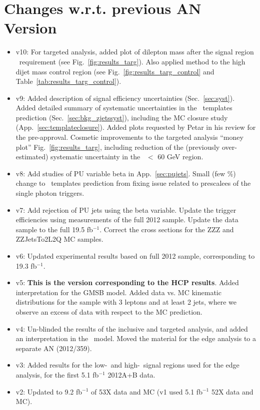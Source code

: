 \section{Changes w.r.t. previous AN Version}
\label{sec:changes}

\begin{itemize}

\item v10: For targeted analysis, added plot of dilepton mass after the signal region \MET\ requirement (see Fig.~\ref{fig:results_targ}). Also applied method to the high dijet mass control region (see Fig.~\ref{fig:results_targ_control} and Table~\ref{tab:results_targ_control}).
\item v9: Added description of signal efficiency uncertainties (Sec.~\ref{sec:syst}). 
Added detailed summary of systematic uncertainties in the \MET\ templates prediction (Sec.~\ref{sec:bkg_zjetssyst}), including the MC closure study (App.~\ref{sec:templateclosure}).
Added plots requested by Petar in his review for the pre-approval. Cosmetic improvements to the targeted analysis ``money plot'' Fig.~\ref{fig:results_targ}, including
reduction of the (previously over-estimated) systematic uncertainty in the \MET\ $<$ 60 GeV region.
\item v8: Add studies of PU variable beta in App.~\ref{sec:pujets}. Small (few \%) change to \MET\ templates prediction from fixing issue related to prescalees of the single photon triggers.
\item v7: Add rejection of PU jets using the beta variable. Update the trigger efficiencies using measurements of the full 2012 sample. Update the data sample to the full 19.5 fb$^{-1}$. Correct the cross sections for the ZZZ and ZZJetsTo2L2Q MC samples.
\item v6: Updated experimental results based on full 2012 sample, corresponding to 19.3 fb$^{-1}$.
\item v5: {\bf This is the version corresponding to the HCP results}. Added interpretation for the GMSB model. %
Added data vs. MC kinematic distributions for the sample with 3 leptons and at least 2 jets, where we observe an excess of data with respect to the MC prediction. %
\item v4: Un-blinded the results of the inclusive and targeted analysis, and added an interpretation in the \wzmet\ model. Moved the material for the edge analysis to a separate AN (2012/359).
\item v3: Added results for the low-\MET\ and high-\MET\ signal regions used for the edge analysis, for the first 5.1 fb$^{-1}$ 2012A+B data.
\item v2: Updated to 9.2 fb$^{-1}$ of 53X data and MC (v1 used 5.1 fb$^{-1}$ 52X data and MC).

\end{itemize}
